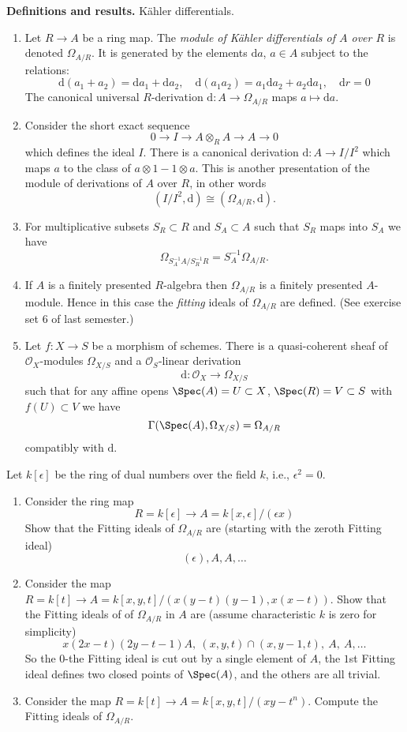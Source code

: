 \noindent
{\bf Definitions and results.} K\"ahler differentials.
\begin{enumerate}
\item Let $R \to A$ be a ring map. The {\it module of K\"ahler
differentials of $A$ over $R$} is denoted $\Omega_{A/R}$.
It is generated by the elements $\text{d}a$, $a \in A$
subject to the relations:
$$
\text{d}(a_1 + a_2) = \text{d}a_1 + \text{d}a_2,\quad
\text{d}(a_1a_2) = a_1\text{d}a_2 + a_2\text{d}a_1,\quad
\text{d}r = 0
$$
The canonical universal $R$-derivation $\text{d} : A \to \Omega_{A/R}$
maps $a\mapsto \text{d}a$.
\item Consider the short exact sequence
$$
0 \to I \to A \otimes_R A \to A \to 0
$$
which defines the ideal $I$. There is a canonical derivation
$\text{d} : A \to I/I^2$ which maps $a$ to the class of
$a \otimes 1 - 1 \otimes a$. This is another presentation of
the module of derivations of $A$ over $R$, in other words
$$
(I/I^2, \text{d}) \cong (\Omega_{A/R}, \text{d}).
$$
\item For multiplicative subsets $S_R \subset R$ and
$S_A \subset A$ such that $S_R$ maps into $S_A$ we have
$$
\Omega_{S_A^{-1}A / S_R^{-1}R} =
S_A^{-1}\Omega_{A/R}.
$$
\item If $A$ is a finitely presented $R$-algebra then
$\Omega_{A/R}$ is a finitely presented $A$-module. Hence in
this case the {\it fitting} ideals of $\Omega_{A/R}$ are defined.
(See exercise set 6 of last semester.)
\item Let $f : X \to S$ be a morphism of schemes. There is
a quasi-coherent sheaf of ${\mathcal O}_X$-modules $\Omega_{X/S}$
and a ${\mathcal O}_S$-linear derivation
$$
\text{d} : {\mathcal O}_X \longrightarrow \Omega_{X/S}
$$
such that for any affine opens $\Spec(A) = U \subset X$,
$\Spec(R) = V \subset S$
with $f(U) \subset V$ we have
$$
\Gamma(\Spec(A), \Omega_{X/S}) = \Omega_{A/R}
$$
compatibly with $\text{d}$.
\end{enumerate}

\begin{exercise}
\label{exercise-dual-numbers}
Let $k[\epsilon]$ be the ring of dual numbers
over the field $k$, i.e., $\epsilon^2 = 0$.
\begin{enumerate}
\item Consider the ring map
$$
R = k[\epsilon] \to A = k[x, \epsilon]/(\epsilon x)
$$
Show that the Fitting ideals of $\Omega_{A/R}$ are (starting with the
zeroth Fitting ideal)
$$
(\epsilon), A, A, \ldots
$$
\item Consider the map $R = k[t] \to
A = k[x, y, t]/(x(y-t)(y-1), x(x-t))$. Show that the Fitting ideals of
of $\Omega_{A/R}$ in $A$ are (assume characteristic $k$ is zero
for simplicity)
$$
x(2x-t)(2y-t-1)A, \ (x, y, t)\cap (x, y-1, t), \ A, \ A, \ldots
$$
So the $0$-the Fitting ideal is cut out by a single element of $A$,
the $1$st Fitting ideal defines two closed points of $\Spec(A)$, and
the others are all trivial.
\item Consider the map $R = k[t] \to A = k[x, y, t]/(xy-t^n)$.
Compute the Fitting ideals of $\Omega_{A/R}$.
\end{enumerate}
\end{exercise}


